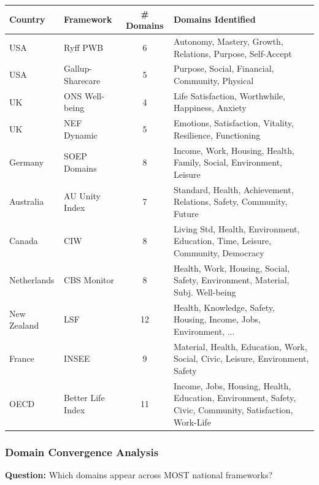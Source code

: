 \begin{center}
\scriptsize
\begin{tabular}{@{}llcl@{}}
\toprule
\textbf{Country} & \textbf{Framework} & \textbf{\# Domains} & \textbf{Domains Identified} \\
\midrule
USA & Ryff PWB & 6 & Autonomy, Mastery, Growth, Relations, Purpose, Self-Accept \\
USA & Gallup-Sharecare & 5 & Purpose, Social, Financial, Community, Physical \\
UK & ONS Well-being & 4 & Life Satisfaction, Worthwhile, Happiness, Anxiety \\
UK & NEF Dynamic & 5 & Emotions, Satisfaction, Vitality, Resilience, Functioning \\
Germany & SOEP Domains & 8 & Income, Work, Housing, Health, Family, Social, Environment, Leisure \\
Australia & AU Unity Index & 7 & Standard, Health, Achievement, Relations, Safety, Community, Future \\
Canada & CIW & 8 & Living Std, Health, Environment, Education, Time, Leisure, Community, Democracy \\
Netherlands & CBS Monitor & 8 & Health, Work, Housing, Social, Safety, Environment, Material, Subj. Well-being \\
New Zealand & LSF & 12 & Health, Knowledge, Safety, Housing, Income, Jobs, Environment, ... \\
France & INSEE & 9 & Material, Health, Education, Work, Social, Civic, Leisure, Environment, Safety \\
\midrule
OECD & Better Life Index & 11 & Income, Jobs, Housing, Health, Education, Environment, Safety, Civic, Community, Satisfaction, Work-Life \\
\bottomrule
\end{tabular}
\end{center}

\subsubsection{Domain Convergence Analysis}

\textbf{Question:} Which domains appear across MOST national frameworks?

